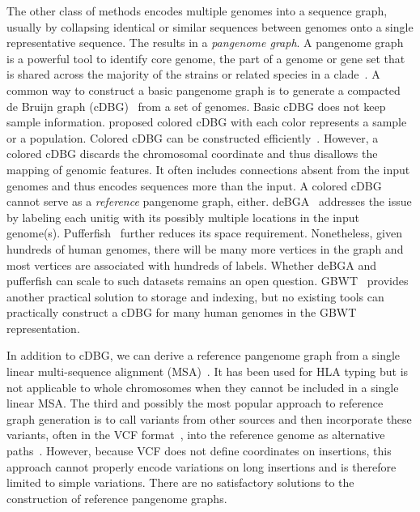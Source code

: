 \documentclass[twocolumn]{bmcart}
\begin{document}
The other class of methods encodes multiple genomes into a sequence graph,
usually by collapsing identical or similar sequences between genomes onto a
single representative sequence. The results in a \emph{pangenome graph}. A
pangenome graph is a powerful tool to identify core genome, the part of a
genome or gene set that is shared across the majority of the strains or related species
in a clade~\cite{Vernikos:2015aa}. A common way to construct a basic pangenome
graph is to generate a compacted de Bruijn graph
(cDBG)~\cite{Marcus:2014xy,Baier_2015,Beller:2016ab,Chikhi:2015aa,Minkin_2016,Chikhi_2016,almodaresi_et_al:LIPIcs:2017:7657}
from a set of genomes. Basic cDBG does not keep sample information.
\cite{Iqbal:2012aa} proposed colored cDBG with each color represents a sample
or a population. Colored cDBG can be constructed
efficiently~\cite{Muggli_2019,Holley695338}. However, a colored cDBG discards
the chromosomal coordinate and thus disallows the mapping of genomic features.
It often includes connections absent from the input genomes and thus encodes
sequences more than the input. A colored cDBG cannot serve as a
\emph{reference} pangenome graph, either.  deBGA~\cite{Liu:2016ac} addresses
the issue by labeling each unitig with its possibly multiple locations in the
input genome(s). Pufferfish~\cite{Almodaresi:2018aa} further reduces its space
requirement. Nonetheless, given hundreds of human genomes, there will be many
more vertices in the graph and most vertices are associated with hundreds of
labels. Whether deBGA and pufferfish can scale to such datasets remains an open
question. GBWT~\cite{Sir_n_2019} provides another practical solution to storage
and indexing, but no existing tools can practically construct a cDBG for many
human genomes in the GBWT representation.

In addition to cDBG, we can derive a reference pangenome
graph from a single linear multi-sequence alignment (MSA)~\cite{Dilthey_2015,Dilthey_2019}.
It has been used for HLA typing but is not applicable to whole chromosomes when
they cannot be included in a single linear MSA. The third and possibly the most
popular approach to reference graph generation is to call variants from other
sources and then incorporate these variants, often in the VCF format~\cite{Danecek:2011qy}, into
the reference genome as alternative
paths~\cite{Eggertsson:2017aa,Rakocevic_2019,Sibbesen:2018aa,Biederstedt:2018aa,Eggertsson_2019}.
However, because VCF does not define coordinates on insertions, this approach
cannot properly encode variations on long insertions and is therefore limited
to simple variations. There are no satisfactory solutions to the construction
of reference pangenome graphs.
\end{document}
